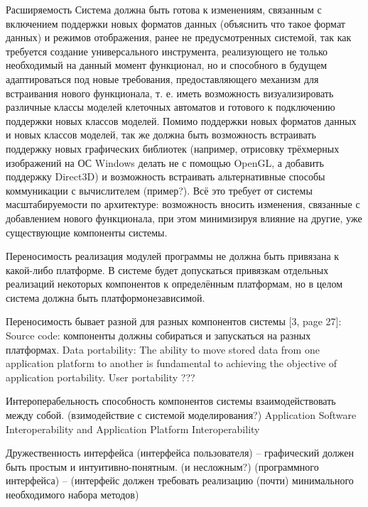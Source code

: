 \documentclass[a4paper,12pt]{extarticle}
\begin{document}
\begin{subsubsection}{Расширяемость}
    Система должна быть готова к изменениям, связанным с включением поддержки новых форматов данных (объяснить что такое формат данных) и режимов отображения, ранее не предусмотренных системой, так как требуется создание универсального инструмента, реализующего не только необходимый на данный момент функционал, но и способного в будущем адаптироваться под новые требования, предоставляющего механизм для встраивания нового функционала, т. е. иметь возможность визуализировать различные классы моделей клеточных автоматов и готового к подключению поддержки новых классов моделей. Помимо поддержки новых форматов данных и новых классов моделей, так же должна быть возможность встраивать поддержку новых графических библиотек (например, отрисовку трёхмерных изображений на ОС Windows делать не с помощью OpenGL, а добавить поддержку Direct3D) и возможность встраивать альтернативные способы коммуникации с вычислителем (пример?).
    Всё это требует от системы масштабируемости по архитектуре: возможность вносить изменения, связанные с добавлением нового функционала, при этом минимизируя влияние на другие, уже существующие компоненты системы.
\end{subsubsection}
    
\begin{subsubsection}{Переносимость}
    реализация модулей программы не должна быть привязана к какой-либо платформе. В системе будет допускаться привязкам отдельных реализаций некоторых компонентов к определённым платформам, но в целом система должна быть платформонезависимой.
    
    Переносимость бывает разной для разных компонентов системы [3, page 27]:
    Source code: компоненты должны собираться и запускаться на разных платформах.
    Data portability: The ability to move stored data from one application platform to another is fundamental to achieving the objective of application portability. 
    User portability ???
\end{subsubsection}
    
\begin{subsubsection}{Интероперабельность}
    способность компонентов системы взаимодействовать между собой. (взимодействие с системой моделирования?)
    Application Software Interoperability and Application Platform Interoperability
\end{subsubsection}
    
\begin{subsubsection}{Дружественность интерфейса}
    (интерфейса пользователя) – графический должен быть простым и интуитивно-понятным. (и несложным?)
    (программного интерфейса) –  (интерфейс должен требовать реализацию (почти) минимального необходимого набора методов)
\end{subsubsection}
\end{document}
